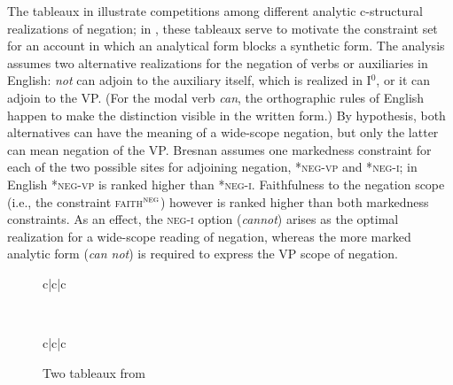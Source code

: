 \documentclass[output=paper,hidelinks]{langscibook}
\begin{document}
The tableaux in  illustrate competitions among different analytic c-structural realizations of negation; in \citet[ex.~43]{Bresnan-Explaining-Morphosyntactic}, these tableaux serve to motivate the constraint set for an account in which an analytical form blocks a synthetic form. The analysis assumes two alternative realizations for the negation of verbs or auxiliaries in English: \emph{not} can adjoin to the auxiliary itself, which is realized in I$^0$, or it can adjoin to the VP. (For the modal verb \emph{can}, the orthographic rules of English happen to make the distinction visible in the written form.) By hypothesis, both alternatives can have the meaning of a wide-scope negation, but only the latter can mean negation of the VP. Bresnan assumes one markedness constraint for each of the two possible sites for adjoining negation, *\textsc{neg-vp} and *\textsc{neg-i}; in English *\textsc{neg-vp} is ranked higher than *\textsc{neg-i}. Faithfulness to the negation scope (i.e., the constraint \textsc{faith}$^\textsc{neg}$) however is ranked higher than both markedness constraints. As an effect, the \textsc{neg-i} option (\emph{cannot}) arises as the optimal realization for a wide-scope reading of negation, whereas the more marked analytic form (\emph{can not}) is required to express the VP scope of negation.

\begin{figure}

\ShadingOn
\begin{tableau}{c|c|c}
   
  \vio{} \vio{} \vio{*}
  \vio{} \vio{*!} \vio{}
\end{tableau}

\ \\[1ex]

\begin{tableau}{c|c|c}
   
  \vio{*!} \vio{} \vio{*} 
  \vio{} \vio{*} \vio{}
\end{tableau}



\caption{Two tableaux from  \citet[ex.~43]{Bresnan-Explaining-Morphosyntactic}}
\label{fig:cannot}
\end{figure}
\end{document}
